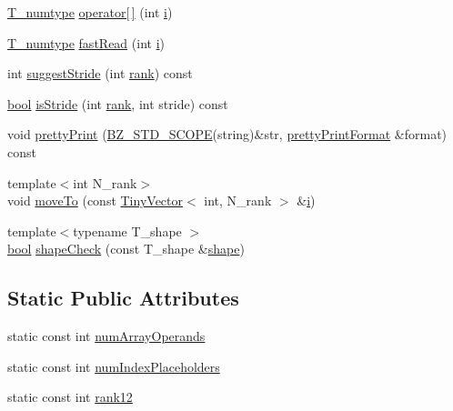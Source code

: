 \begin{DoxyCompactItemize}
\item 
\hyperlink{class__bz__FunctorExpr3_ad90a6f210859e4b689cd783be74ee748}{T\+\_\+numtype} \hyperlink{class__bz__FunctorExpr3_a38a8d684cc0b896b8216f41f84dbd60f}{operator\mbox{[}$\,$\mbox{]}} (int \hyperlink{indexexpr_8h_aabd77643995707c185e95c8cb2782c81}{i})
\item 
\hyperlink{class__bz__FunctorExpr3_ad90a6f210859e4b689cd783be74ee748}{T\+\_\+numtype} \hyperlink{class__bz__FunctorExpr3_a753e0c364345d2d197a3a20db26590ed}{fast\+Read} (int \hyperlink{indexexpr_8h_aabd77643995707c185e95c8cb2782c81}{i})
\item 
int \hyperlink{class__bz__FunctorExpr3_a9b1e25d325bfd36c51db9befa2394b82}{suggest\+Stride} (int \hyperlink{zfftnd_8c_a6cfd95afd0afebd625b889fb6e58371c}{rank}) const 
\item 
\hyperlink{compiler_8h_abb452686968e48b67397da5f97445f5b}{bool} \hyperlink{class__bz__FunctorExpr3_afcee1497f798b087cdd80650702b2161}{is\+Stride} (int \hyperlink{zfftnd_8c_a6cfd95afd0afebd625b889fb6e58371c}{rank}, int stride) const 
\item 
void \hyperlink{class__bz__FunctorExpr3_a058f8971c277cc03c24505bb58a52f33}{pretty\+Print} (\hyperlink{numinquire_8h_a2b24ffc3b4ef9803956bc7715c6c7b83}{B\+Z\+\_\+\+S\+T\+D\+\_\+\+S\+C\+O\+P\+E}(string)\&str, \hyperlink{classprettyPrintFormat}{pretty\+Print\+Format} \&format) const 
\item 
{\footnotesize template$<$int N\+\_\+rank$>$ }\\void \hyperlink{class__bz__FunctorExpr3_af79e9fdab2f4432e057ae108357449b4}{move\+To} (const \hyperlink{classTinyVector}{Tiny\+Vector}$<$ int, N\+\_\+rank $>$ \&\hyperlink{indexexpr_8h_aabd77643995707c185e95c8cb2782c81}{i})
\item 
{\footnotesize template$<$typename T\+\_\+shape $>$ }\\\hyperlink{compiler_8h_abb452686968e48b67397da5f97445f5b}{bool} \hyperlink{class__bz__FunctorExpr3_a629c64585c0b4c9cc0b84160c742c356}{shape\+Check} (const T\+\_\+shape \&\hyperlink{shape_8h_a9d9da3dcaecbbde6cf1961063f2e838b}{shape})
\end{DoxyCompactItemize}
\subsection*{Static Public Attributes}
\begin{DoxyCompactItemize}
\item 
static const int \hyperlink{class__bz__FunctorExpr3_aa4e099a13edfc8d133cc042f15cadc39}{num\+Array\+Operands}
\item 
static const int \hyperlink{class__bz__FunctorExpr3_a629b44040bfa7c287de36ccaf4a271ad}{num\+Index\+Placeholders}
\item 
static const int \hyperlink{class__bz__FunctorExpr3_a7587f3bcbc2d66a723cb9a62075b42fd}{rank12}
\end{DoxyCompactItemize}
